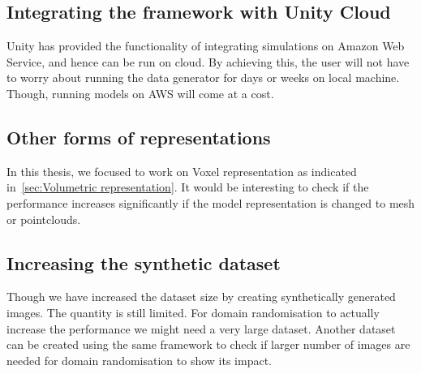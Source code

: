 \subsection{Integrating the framework with Unity Cloud}
Unity has provided the functionality of integrating simulations on Amazon Web Service, and hence can be run on cloud.
By achieving this, the user will not have to worry about running the data generator for days or weeks on local machine.
Though, running models on AWS will come at a cost.

\subsection{Other forms of representations}
In this thesis, we focused to work on Voxel representation as indicated in~\ref{sec:Volumetric representation}.
It would be interesting to check if the performance increases significantly if the model representation is changed to mesh or pointclouds.

\subsection{Increasing the synthetic dataset}
Though we have increased the dataset size by creating synthetically generated images.
The quantity is still limited.
For domain randomisation to actually increase the performance we might need a very large dataset.
Another dataset can be created using the same framework to check if larger number of images are needed for domain randomisation to show its impact.



